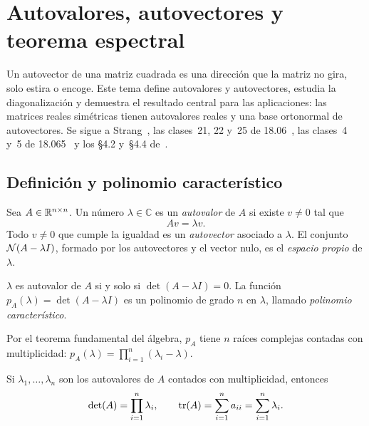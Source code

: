 \chapter{Autovalores, autovectores y teorema espectral}
\label{tema:3}

Un autovector de una matriz cuadrada es una dirección que la matriz no gira, solo estira o encoge. Este tema define autovalores y autovectores, estudia la diagonalización y demuestra el resultado central para las aplicaciones: las matrices reales simétricas tienen autovalores reales y una base ortonormal de autovectores. Se sigue a Strang~\cite[§6.1--6.3]{strang-ila}, las clases~21, 22 y~25 de 18.06~\cite{mit1806}, las clases~4 y~5 de 18.065~\cite{mit18065} y los §4.2 y~§4.4 de~\cite{mml}.

\section{Definición y polinomio característico}

\begin{definicion}
Sea $A\in\mathbb{R}^{n\times n}$. Un número $\lambda\in\mathbb{C}$ es un \emph{autovalor} de $A$ si existe $v\ne 0$ tal que
\[
Av=\lambda v.
\]
Todo $v\ne 0$ que cumple la igualdad es un \emph{autovector} asociado a $\lambda$. El conjunto $\mathcal{N}(A-\lambda I)$, formado por los autovectores y el vector nulo, es el \emph{espacio propio} de $\lambda$.
\end{definicion}

\begin{proposicion}\label{prop:polcar}
$\lambda$ es autovalor de $A$ si y solo si $\det(A-\lambda I)=0$. La función $p_A(\lambda)=\det(A-\lambda I)$ es un polinomio de grado $n$ en $\lambda$, llamado \emph{polinomio característico}.
\end{proposicion}

Por el teorema fundamental del álgebra, $p_A$ tiene $n$ raíces complejas contadas con multiplicidad: $p_A(\lambda)=\prod_{i=1}^{n}(\lambda_i-\lambda)$.

\addtocounter{definicion}{1}%

\begin{proposicion}\label{prop:traza-det}
Si $\lambda_1,\dots,\lambda_n$ son los autovalores de $A$ contados con multiplicidad, entonces
\[
\det(A)=\prod_{i=1}^{n}\lambda_i,\qquad \operatorname{tr}(A)=\sum_{i=1}^{n}a_{ii}=\sum_{i=1}^{n}\lambda_i.
\]
\end{proposicion}

